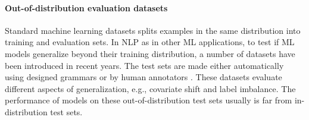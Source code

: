 


\paragraph{Out-of-distribution evaluation datasets}
Standard machine learning datasets splits examples in the same distribution into training and evaluation sets.
In NLP as in other ML applications, to test if ML models generalize beyond their training distribution, a number of datasets have been introduced in recent years.
The test sets are made either automatically using designed grammars \cite{linzen2019right}
or by human annotators \cite{xyz}. 
These datasets evaluate different aspects of generalization, e.g., covariate shift and label imbalance. 
The performance of models on these out-of-distribution test sets usually is far from in-distribution test sets.


